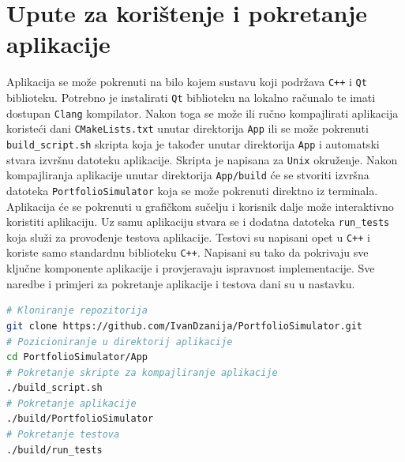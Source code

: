 \documentclass[zavrsnirad]{fer}
\begin{document}
\chapter{Upute za korištenje i pokretanje aplikacije}
\label{sek:upute_za_koristenje}
Aplikacija se može pokrenuti na bilo kojem sustavu koji podržava
\texttt{C++} i \texttt{Qt} biblioteku. Potrebno je instalirati \texttt{Qt}
biblioteku na lokalno računalo te imati dostupan \texttt{Clang} kompilator.
Nakon toga se može ili ručno kompajlirati aplikacija koristeći dani
\texttt{CMakeLists.txt} unutar direktorija \texttt{App} ili se može
pokrenuti \texttt{build\_script.sh} skripta koja je također unutar direktorija
\texttt{App} i automatski stvara izvršnu datoteku aplikacije. Skripta je
napisana za \texttt{Unix} okruženje.
Nakon kompajliranja aplikacije unutar direktorija \texttt{App/build} će se
stvoriti izvršna datoteka \texttt{PortfolioSimulator} koja se može pokrenuti
direktno iz terminala. Aplikacija će se pokrenuti u grafičkom sučelju
i korisnik dalje može interaktivno koristiti aplikaciju. Uz samu aplikaciju
stvara se i dodatna datoteka \texttt{run\_tests} koja služi za provođenje
testova aplikacije. Testovi su napisani opet u \texttt{C++} i koriste samo standardnu
biblioteku \texttt{C++}. Napisani su tako da pokrivaju sve ključne
komponente aplikacije i provjeravaju ispravnost implementacije.
Sve naredbe i primjeri za pokretanje aplikacije i testova dani su u
nastavku.
\begin{lstlisting}[language=bash, caption={Primjeri naredbi za pokretanje aplikacije i testova}]
# Kloniranje repozitorija
git clone https://github.com/IvanDzanija/PortfolioSimulator.git
# Pozicioniranje u direktorij aplikacije
cd PortfolioSimulator/App
# Pokretanje skripte za kompajliranje aplikacije
./build_script.sh
# Pokretanje aplikacije
./build/PortfolioSimulator
# Pokretanje testova
./build/run_tests
\end{lstlisting}




\end{document}
